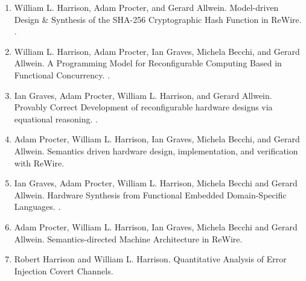 \documentclass[12pt]{article} %
\begin{document}
\begin{enumerate}[leftmargin=0.0mm]
\item
William L. Harrison, Adam Procter, and Gerard Allwein.
\newblock Model-driven Design \& Synthesis of the SHA-256 Cryptographic Hash Function in ReWire.
.




\item
William L. Harrison, Adam Procter, Ian Graves, Michela Becchi, and Gerard Allwein. 
\newblock A Programming Model for Reconfigurable Computing Based in Functional Concurrency.
.

\item
Ian Graves, Adam Procter, William L. Harrison, and Gerard Allwein.
\newblock Provably Correct Development of reconfigurable hardware designs via equational reasoning.
.

\item
Adam Procter, William L. Harrison, Ian Graves, Michela Becchi, and Gerard Allwein. 
\newblock Semantics driven hardware design, implementation, and verification with ReWire. 

\item
Ian Graves, Adam Procter, William L. Harrison, Michela Becchi and Gerard Allwein.
\newblock Hardware Synthesis from Functional Embedded Domain-Specific Languages.
.


\item
Adam Procter, William L. Harrison, Ian Graves, Michela Becchi and Gerard Allwein.
\newblock Semantics-directed Machine Architecture in ReWire.

\item
Robert Harrison and William L. Harrison.
\newblock Quantitative Analysis of Error Injection Covert Channels.


\end{enumerate}
\end{document}
